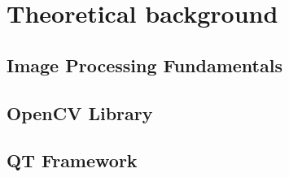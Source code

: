\chapter{Theoretical background}

\section{Image Processing Fundamentals}

\section{OpenCV Library}

\section{QT Framework}

